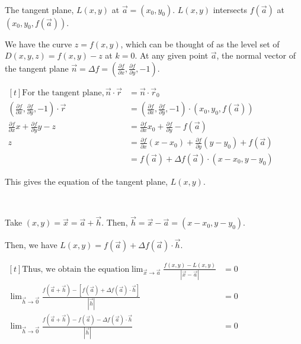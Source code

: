 \documentclass[11pt,fleqn]{book} %
\begin{document}
    {~~~}

    The tangent plane, $L(x,y)$ at $\vec{a} = (x_0, y_0)$. $L(x,y)$ intersects $f(\vec{a})$ at $(x_0, y_0, f(\vec{a}))$. 
        
    We have the curve $z = f(x,y)$, which can be thought of as the level set of $D(x,y,z) = f(x,y) - z$ at $k = 0$. At any given point $\vec{a}$, the normal vector of the tangent plane $\vec{n} = \Delta f = \left( \frac{\partial f}{\partial x}, \frac{\partial f}{\partial y}, -1 \right)$. 
    
    $\begin{aligned}[t]
        \text{For the tangent plane}, \vec{n} \cdot \vec{r}
        &= \vec{n} \cdot \vec{r}_0 \\
        \left( \frac{\partial f}{\partial x}, \frac{\partial f}{\partial y}, -1 \right) \cdot \vec{r} 
        &= \left( \frac{\partial f}{\partial x}, \frac{\partial f}{\partial y}, -1 \right) \cdot \left( x_0, y_0, f(\vec{a}) \right) \\
        \frac{\partial f}{\partial x} x + \frac{\partial f}{\partial y} y - z 
        &= \frac{\partial f}{\partial x} x_0 + \frac{\partial f}{\partial y} - f(\vec{a}) \\
        z
        &= \frac{\partial f}{\partial x} (x - x_0) + \frac{\partial f}{\partial y} (y - y_0) + f(\vec{a}) \\
        &= f(\vec{a}) + \Delta f(\vec{a}) \cdot (x-x_0, y-y_0)
    \end{aligned}$
    
    This gives the equation of the tangent plane, $L(x,y)$. 
    
    {~~~}
    
    Take $(x,y) = \vec{x} = \vec{a} + \vec{h}$. Then, $\vec{h} = \vec{x} - \vec{a} = (x - x_0, y - y_0)$. 
    
    Then, we have $L(x,y) = f(\vec{a}) + \Delta f(\vec{a}) \cdot \vec{h}$. 
    
    $\begin{aligned}[t]
    \text{Thus, we obtain the equation}
        \lim_{\vec{x}\to\vec{a}} \frac{f(x,y) - L(x,y)}{| \vec{x} - \vec{a} |} &= 0 \\
        \lim_{\vec{h}\to\vec{0}} \frac{f(\vec{a} + \vec{h}) - \left[ f(\vec{a}) + \Delta f(\vec{a}) \cdot \vec{h} \right]}{| \vec{h} |} &= 0 \\
        \lim_{\vec{h}\to\vec{0}} \frac{f(\vec{a} + \vec{h}) - f(\vec{a}) - \Delta f(\vec{a}) \cdot \vec{h}}{| \vec{h} |} &= 0
    \end{aligned}$
\end{document}
